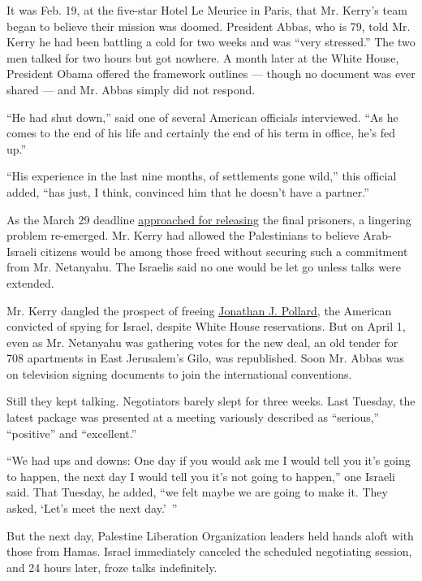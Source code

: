 It was Feb. 19, at the five-star Hotel Le Meurice in Paris, that Mr.
Kerry's team began to believe their mission was doomed. President Abbas,
who is 79, told Mr. Kerry he had been battling a cold for two weeks and
was ``very stressed.'' The two men talked for two hours but got nowhere.
A month later at the White House, President Obama offered the framework
outlines --- though no document was ever shared --- and Mr. Abbas simply
did not respond.

``He had shut down,'' said one of several American officials
interviewed. ``As he comes to the end of his life and certainly the end
of his term in office, he's fed up.''

``His experience in the last nine months, of settlements gone wild,''
this official added, ``has just, I think, convinced him that he doesn't
have a partner.''

As the March 29 deadline
\href{http://www.nytimes.com/2014/03/24/world/middleeast/standoff-over-prisoner-release-threatens-mideast-talks.html}{approached
for releasing} the final prisoners, a lingering problem re-emerged. Mr.
Kerry had allowed the Palestinians to believe Arab-Israeli citizens
would be among those freed without securing such a commitment from Mr.
Netanyahu. The Israelis said no one would be let go unless talks were
extended.

Mr. Kerry dangled the prospect of freeing
\href{http://www.nytimes.com/2014/04/01/world/middleeast/pollard.html}{Jonathan
J. Pollard}, the American convicted of spying for Israel, despite White
House reservations. But on April 1, even as Mr. Netanyahu was gathering
votes for the new deal, an old tender for 708 apartments in East
Jerusalem's Gilo, was republished. Soon Mr. Abbas was on television
signing documents to join the international conventions.

Still they kept talking. Negotiators barely slept for three weeks. Last
Tuesday, the latest package was presented at a meeting variously
described as ``serious,'' ``positive'' and ``excellent.''

``We had ups and downs: One day if you would ask me I would tell you
it's going to happen, the next day I would tell you it's not going to
happen,'' one Israeli said. That Tuesday, he added, ``we felt maybe we
are going to make it. They asked, `Let's meet the next day.'~''

But the next day, Palestine Liberation Organization leaders held hands
aloft with those from Hamas. Israel immediately canceled the scheduled
negotiating session, and 24 hours later, froze talks indefinitely.


